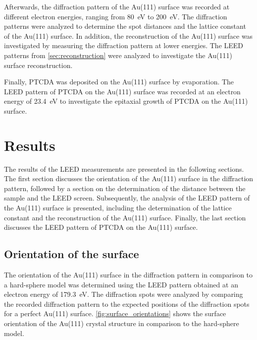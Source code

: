\documentclass[fontsize=11pt,reqno,a4paper,oneside]{scrartcl}
\begin{document}
Afterwards, the diffraction pattern of the Au(111) surface was recorded at different electron energies, ranging from 80~\si{eV} to 200~\si{eV}. The diffraction patterns were analyzed to determine the spot distances and the lattice constant of the Au(111) surface. In addition, the reconstruction of the Au(111) surface was investigated by measuring the diffraction pattern at lower energies. The \ac{LEED} patterns from \autoref{sec:reconstruction} were analyzed to investigate the Au(111) surface reconstruction.

Finally, \ac{PTCDA} was deposited on the Au(111) surface by evaporation. The \ac{LEED} pattern of \ac{PTCDA} on the Au(111) surface was recorded at an electron energy of 23.4~\si{eV} to investigate the epitaxial growth of \ac{PTCDA} on the Au(111) surface.

\clearpage
\section{Results}

The results of the \ac{LEED} measurements are presented in the following sections. The first section discusses the orientation of the Au(111) surface in the diffraction pattern, followed by a section on the determination of the distance between the sample and the \ac{LEED} screen. Subsequently, the analysis of the \ac{LEED} pattern of the Au(111) surface is presented, including the determination of the lattice constant and the reconstruction of the Au(111) surface. Finally, the last section discusses the \ac{LEED} pattern of \ac{PTCDA} on the Au(111) surface.

\subsection{Orientation of the surface}

The orientation of the Au(111) surface in the diffraction pattern in comparison to a hard-sphere model was determined using the \ac{LEED} pattern obtained at an electron energy of 179.3~\si{eV}. The diffraction spots were analyzed by comparing the recorded diffraction pattern to the expected positions of the diffraction spots for a perfect Au(111) surface. \autoref{fig:surface_orientations} shows the surface orientation of the Au(111) crystal structure in comparison to the hard-sphere model.
\end{document}
